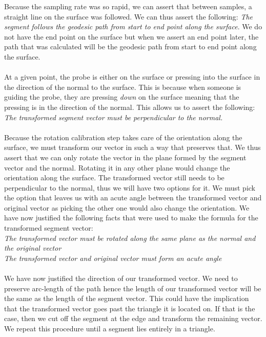 \documentclass[conference]{acmsiggraph}
\begin{document}
Because the sampling rate was so rapid, we can assert that between samples, a straight line on the surface was followed. We can thus assert the following: {\it The segment follows the geodesic path from start to end point along the surface}. We do not have the end point on the surface but when we assert an end point later, the path that was calculated will be the geodesic path from start to end point along the surface. \\
\\
At a given point, the probe is either on the surface or pressing into the surface in the direction of the normal to the surface. This is because when someone is guiding the probe, they are pressing {\it down} on the surface meaning that the pressing is in the direction of the normal. This allows us to assert the following: {\it The transformed segment vector must be perpendicular to the normal. }\\
\\
Because the rotation calibration step takes care of the orientation along the surface, we must transform our vector in such a way that preserves that. We thus assert that we can only rotate the vector in the plane formed by the segment vector and the normal. Rotating it in any other plane would change the orientation along the surface. The transformed vector still needs to be perpendicular to the normal, thus we will have two options for it. We must pick the option that leaves us with an acute angle between the transformed vector and original vector as picking the other one would also change the orientation. We have now justified the following facts that were used to make the formula for the transformed segment vector: \\
{\it The transformed vector must be rotated along the same plane as the normal and the original vector}\\
{\it The transformed vector and original vector must form an acute angle}
\\
\\
We have now justified the direction of our transformed vector. We need to preserve arc-length of the path hence the length of our transformed vector will be the same as the length of the segment vector. This could have the implication that the transformed vector goes past the triangle it is located on. If that is the case, then we cut off the segment at the edge and transform the remaining vector. We repeat this procedure until a segment lies entirely in a triangle. \\
\\
\end{document}
